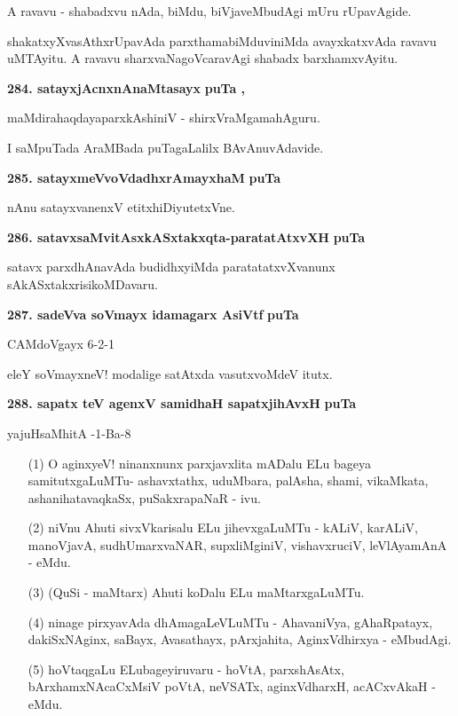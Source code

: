 A ravavu - shabadxvu nAda, biMdu, biVjaveMbudAgi mUru rUpavAgide.

shakatxyXvasAthxrUpavAda parxthamabiMduviniMda avayxkatxvAda ravavu uMTAyitu. A ravavu sharxvaNagoVcaravAgi shabadx barxhamxvAyitu.

\medskip
\noindent
\textbf{284. satayxjAcnxnAnaMtasayx} \hfill{\bf puTa , }

\hfill{maMdirahaqdayaparxkAshiniV - shirxVraMgamahAguru.}

\smallskip
I saMpuTada AraMBada puTagaLalilx BAvAnuvAdavide.

\medskip
\noindent
\textbf{285. satayxmeVvoVdadhxrAmayxhaM} \hfill{\bf puTa }

\smallskip
nAnu satayxvanenxV etitxhiDiyutetxVne.

\medskip
\noindent
\textbf{286. satavxsaMvitAsxkASxtakxqta-paratatAtxvXH} \hfill{\bf puTa }

\smallskip
satavx parxdhAnavAda budidhxyiMda paratatatxvXvanunx sAkASxtakxrisikoMDavaru.

\medskip
\noindent
\textbf{287. sadeVva soVmayx idamagarx AsiVtf} \hfill{\bf puTa }

\hfill{CAMdoVgayx 6-2-1}

\smallskip
eleY soVmayxneV! modalige satAtxda vasutxvoMdeV itutx.

\medskip
\noindent
\textbf{288. sapatx teV agenxV samidhaH sapatxjihAvxH} \hfill{\bf puTa }

\hfill{yajuHsaMhitA -1-Ba-8}

\begin{itemize}
\item[(1)] O aginxyeV! ninanxnunx parxjavxlita mADalu ELu bageya samitutxgaLuMTu- ashavxtathx, uduMbara, palAsha, shami, vikaMkata, ashanihatavaqkaSx, puSakxrapaNaR - ivu.
\item[(2)] niVnu Ahuti sivxVkarisalu ELu jihevxgaLuMTu - kALiV, karALiV, manoVjavA, sudhUmarxvaNAR, supxliMginiV, vishavxruciV, leVlAyamAnA - eMdu.
\item[(3)] (QuSi - maMtarx) Ahuti koDalu ELu maMtarxgaLuMTu.
\item[(4)] ninage pirxyavAda dhAmagaLeVLuMTu - AhavaniVya, gAhaRpatayx, dakiSxNAginx, saBayx, Avasathayx, pArxjahita, AginxVdhirxya - eMbudAgi.
\item[(5)] hoVtaqgaLu ELubageyiruvaru - hoVtA, parxshAsAtx, bArxhamxNAcaCxMsiV poVtA, neVSATx, aginxVdharxH, acACxvAkaH - eMdu.
\end{itemize}

